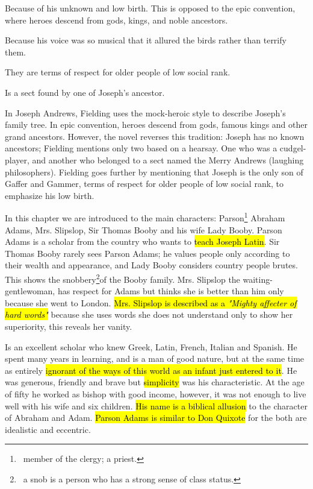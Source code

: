 \documentclass[12pt, a4paper]{article}
\begin{document}
Because of his unknown and low birth. This is opposed to the epic convention,
where heroes descend from gods, kings, and noble ancestors.


Because his voice was so musical that it allured the birds rather than terrify them.


They are terms of respect for older people of low social rank.


Is a sect found by one of Joseph's ancestor.


\ind In Joseph Andrews, Fielding uses the mock-heroic style to describe Joseph's
family tree. In epic convention, heroes descend from gods, famous 
kings and other grand ancestors. However, the novel reverses this tradition: 
Joseph has no known ancestors; Fielding mentions only two based on a hearsay.
One who was a cudgel-player, and another who belonged to a sect named the Merry Andrews 
(laughing philosophers). Fielding goes further 
by mentioning that Joseph is the only son of Gaffer and Gammer,
terms of respect for older people of low social rank, to 
emphasize his low birth.



\ind In this chapter we are introduced to the main characters: Parson\footnote{\, 
member of the clergy; a priest.}  Abraham Adams,
Mrs. Slipslop, Sir Thomas Booby and his wife Lady Booby. Parson Adams is a scholar from 
the country who wants to \hl{teach Joseph Latin}.
Sir Thomas Booby rarely sees Parson Adams; he values people only according to their
wealth and appearance, and Lady Booby considers country people brutes. This shows the snobbery\footnote{
\, a snob is a person who has a strong sense of class status.}of
the Booby family. Mrs. Slipslop the waiting-gentlewoman, has respect for Adams  but thinks she
is better than him only because she went to London. \hl{Mrs. Slipslop is described as a
\textit{"Mighty affecter of hard words"}}
because she uses words she does not understand only to show her superiority,
this reveals her vanity.



Is an excellent scholar who knew Greek, Latin, French, Italian and Spanish.
He spent many years in learning, and is a man of good nature, but at the 
same time as entirely \hl{ignorant of the ways of this world as an infant just
entered to it}. He was generous, friendly and brave but \hl{simplicity} was 
his characteristic. At the age of fifty he worked as bishop with good income,
however, it was not enough to live well with his wife and six children. \hl{His name
is a biblical allusion} to the character of Abraham and Adam. \hl{Parson Adams is similar to 
Don Quixote} for the both are idealistic and eccentric.
\end{document}
